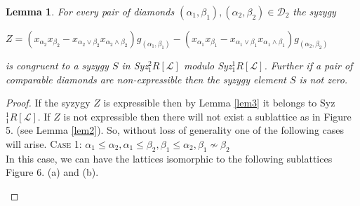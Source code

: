 \documentclass[10pt,reqno]{amsart}
\numberwithin{equation}{section}
\newtheorem{lemma}[theorem]{Lemma}
\begin{document}
\begin{lemma}\label{expressible_main_lemma} For every pair of diamonds $(\alpha_1,\beta_1), (\alpha_2,\beta_2)\in \mathcal{D}_2$ the syzygy
 \begin{center}
 $Z=(x_{\alpha_2}x_{\beta_2}-x_{\alpha_2 \vee \beta_2}x_{\alpha_2 \wedge \beta_2})g_{(\alpha_1,\beta_1)}-
(x_{\alpha_1}x_{\beta_1}- x_{\alpha_1 \vee \beta_1}x_{\alpha_1 \wedge \beta_1})g_{(\alpha_2,\beta_2)}$
\end{center}
is congruent to a syzygy $S$ in Syz$_{1}^{2}R[\mathcal{L}]$ modulo Syz$_{1}^{1}R[\mathcal{L}]$. Further if a pair of comparable diamonds are non-expressible then the syzygy element $S$ is not zero. 
\end{lemma}
\begin{proof}
 If the syzygy $Z$ is expressible then by Lemma \ref{lem3} it belongs to Syz$_{1}^{1}R[\mathcal{L}]$. If $Z$ is not expressible then there will not exist a sublattice as in Figure 5. (see Lemma \ref{lem2}). So, without loss of generality one of the following cases will arise.
 \vskip 1mm 
 \noindent \textsc{Case 1:} $\alpha_1 \leq \alpha_2, \alpha_1 \leq \beta_2, \beta_1 \leq \alpha_2, \beta_1 \nsim \beta_2$\\
 In this case, we can have the lattices isomorphic to the following sublattices Figure 6. (a) and (b).
  \begin{figure}[H] 
\end{figure}
\end{proof}
\end{document}
